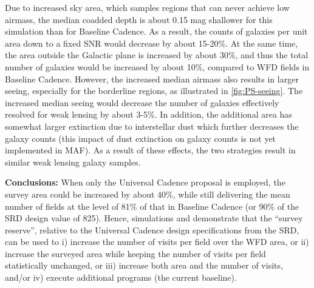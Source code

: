 Due to increased sky area, which samples regions that can never
achieve low airmass, the median coadded depth is about 0.15 mag
shallower for this simulation than for Baseline Cadence. As a result,
the counts of galaxies per unit area down to a fixed SNR would
decrease by about 15-20\%. At the same time, the area outside the
Galactic plane is increased by about 30\%, and thus the total number
of galaxies would be increased by about 10\%, compared to WFD fields
in Baseline Cadence. However, the increased median airmass also
results in larger seeing, especially for the borderline regions, as
illustrated in \autoref{fig:PS-seeing}. The increased median seeing
would decrease the number of galaxies effectively resolved for weak
lensing by about 3-5\%. In addition, the additional area has somewhat
larger extinction due to interstellar dust which further decreases the
galaxy counts (this impact of dust extinction on galaxy counts is not
yet implemented in MAF). As a result of these effects, the two
strategies result in similar weak lensing galaxy samples.

{\bf Conclusions:} When only the Universal Cadence proposal is
employed, the survey area could be increased by about 40\%, while
still delivering the mean number of fields at the level of 81\% of
that in Baseline Cadence (or 90\% of the SRD design value of 825).
Hence, simulations  and 
demonstrate that the ``survey reserve'', relative to the Universal
Cadence design specifications from the SRD, can be used to i) increase
the number of visits per field over the WFD area, or ii) increase the
surveyed area while keeping the number of visits per field
statistically unchanged, or iii) increase both area and the number of
visits, and/or iv) execute additional programs (the current baseline).


